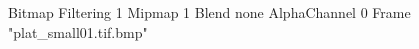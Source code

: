 {Bitmap
	{Filtering 1}
	{Mipmap 1}
	{Blend none}
	{AlphaChannel 0}
	{Frame "plat_small01.tif.bmp"}
}
